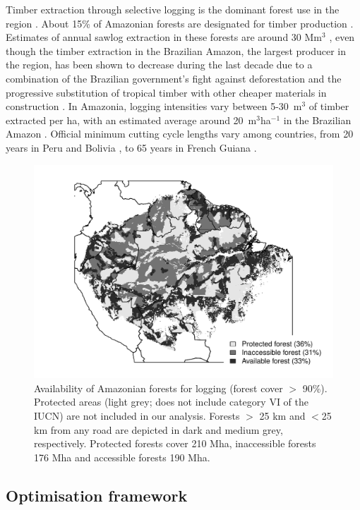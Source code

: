 \documentclass[12pt]{article}
\begin{document}
Timber extraction through selective logging is the dominant forest use in the region \cite{Blaser2011}. About 15\% of Amazonian forests are designated for timber production \cite{FAO2011}. Estimates of annual sawlog extraction in these forests are around 30 Mm$^3$ \cite{Lentini2005}, even though the timber extraction in the Brazilian Amazon, the largest producer in the region, has been shown to decrease during the last decade due to a combination of the Brazilian government's fight against deforestation \cite{Nepstad2014} and the progressive substitution of tropical timber with other cheaper materials in construction \cite{Santos2013}. In Amazonia, logging intensities vary between 5-30~m$^3$ of timber extracted per ha, with an estimated average around 20~m$^3$ha$^{-1}$ in the Brazilian Amazon \cite{Asner2005}. Official minimum cutting cycle lengths vary among countries, from 20 years in Peru and Bolivia \cite{Fredericksen2003,Blaser2011}, to 65 years in French Guiana \cite{Gourlet-Fleury2004}. 

\begin{figure}
    \centering
    \includegraphics[width=\linewidth]{graphs/harv_areas_grey.pdf}
    \caption{Availability of Amazonian forests for logging (forest cover $>$ 90\%). Protected areas (light grey; does not include category VI of the IUCN) are not included in our analysis. Forests $>$ 25 km and $<$25 km from any road are depicted in dark and medium grey, respectively. Protected forests cover 210 Mha, inaccessible forests 176 Mha and accessible forests 190 Mha.}
    \label{fig:pharv}
\end{figure}

\subsection*{Optimisation framework}
\end{document}
